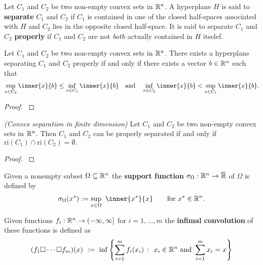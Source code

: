 \begin{definition}
  Let 
  $C_1$ and $C_2$
  be two non-empty convex sets in $\mathbb{R}^n$. 
  A hyperplane $H$ is said to \textbf{separate}
  $C_1$ and $C_2$
  if $C_1$ is contained in one of the closed half-spaces associated with
  $H$ and $C_2$ lies in the opposite closed half-space. It is said to separate 
  $C_1$ and $C_2$
  \textbf{properly} if 
  $C_1$ and $C_2$
  are not \textit{both} actually contained in $H$ itselef.
\end{definition}
\begin{theorem}
  Let $C_1$ and $C_2$ be two non-empty convex sets in $\mathbb{R}^n$. 
  There exists a hyperplane separating
  $C_1$ and $C_2$
  properly 
  if and only if
  there exists a vector $b\in \mathbb{R}^n$ such that
  \begin{gather}
    \sup_{x\in C_2} \inner{x}{b}
    \le
    \inf_{x\in C_1} \inner{x}{b}
    \quad 
    \text{and}
    \quad 
    \inf_{x\in C_2} \inner{x}{b}
    <
    \sup_{x\in C_1} \inner{x}{b}
    .
  \end{gather}
\end{theorem}
\begin{proof}
  \cite[Theorem~11.1]{Rockafellar1970}
\end{proof}
\begin{ftheorem}
  \label{cv:primer:sep}
  \emph{(Convex separation in finite dimension)}
  Let $C_1$ and $C_2$ be two non-empty convex sets in $\mathbb{R}^n$. 
  Then $C_1$ and $C_2$ can be properly separated if and only if 
  $\mathrm{ri}(C_1)\cap\mathrm{ri}(C_2)=\emptyset.$
\end{ftheorem}
\begin{proof}
  \cite[Theorem~11.3]{Rockafellar1970}
\end{proof}




\begin{definition}
  Given a nonempty subset 
  $\Omega \subseteq \mathbb{R}^n$
  the \textbf{support function} 
  $
  \sigma_\Omega : \mathbb{R}^n \to \overline{\mathbb{R}}
  $
  of $\Omega$
  is defined by
  \begin{gather}
    \sigma_\Omega
    (x^*)
    :=
    \sup_{x \in \Omega}
    \ 
    \inner{x^*}{x}
    \qquad
    \text{for}\ 
    x^* \in \R^n
    .
  \end{gather}
\end{definition}


\begin{definition}
  Given functions
  $
    f_i:
    \mathbb{R}^n \to (-\infty, \infty]
  $
  for $ i = 1, \ldots, m $
  the \textbf{infimal convolution} of these functions is defined as
  \begin{gather}
    (f_1 \square \cdots \square f_m)(x)
    \ 
    :=
    \ 
    \inf
    \left\{ 
    \sum_{i = 1}^{m}
      f_i(x_i)
      \ 
      \colon
      \ 
      x_i \in \R^n 
      \ 
      \mathrm{and}\ 
      \sum_{i = 1}^{m} 
        x_i
      =
      x
    \right\}
  \end{gather}
\end{definition}
 
